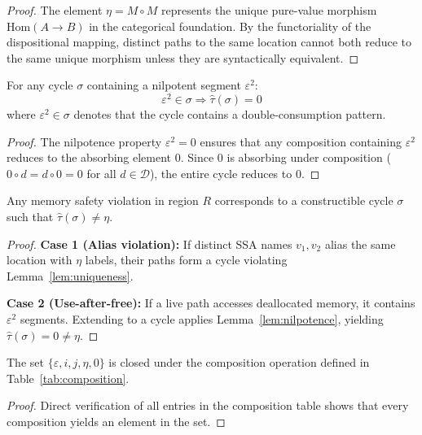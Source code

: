 \documentclass[journal]{IEEEtran}
\begin{document}
\begin{proof}
The element $\eta = M \circ M$ represents the unique pure-value morphism $\text{Hom}(A \to B)$ in the categorical foundation. By the functoriality of the dispositional mapping, distinct paths to the same location cannot both reduce to the same unique morphism unless they are syntactically equivalent.
\end{proof}

\begin{lemma}
\label{lem:nilpotence}
For any cycle $\sigma$ containing a nilpotent segment $\varepsilon^2$:
$$\varepsilon^2 \in \sigma \Rightarrow \hat{\tau}(\sigma) = 0$$
where $\varepsilon^2 \in \sigma$ denotes that the cycle contains a double-consumption pattern.
\end{lemma}

\begin{proof}
The nilpotence property $\varepsilon^2 = 0$ ensures that any composition containing $\varepsilon^2$ reduces to the absorbing element $0$. Since $0$ is absorbing under composition ($0 \circ d = d \circ 0 = 0$ for all $d \in \mathcal{D}$), the entire cycle reduces to $0$.
\end{proof}

\begin{lemma}
\label{lem:cycle_construction}
Any memory safety violation in region $R$ corresponds to a constructible cycle $\sigma$ such that $\hat{\tau}(\sigma) \neq \eta$.
\end{lemma}

\begin{proof}
\textbf{Case 1 (Alias violation):} If distinct SSA names $v_1, v_2$ alias the same location with $\eta$ labels, their paths form a cycle violating Lemma~\ref{lem:uniqueness}.

\textbf{Case 2 (Use-after-free):} If a live path accesses deallocated memory, it contains $\varepsilon^2$ segments. Extending to a cycle applies Lemma~\ref{lem:nilpotence}, yielding $\hat{\tau}(\sigma) = 0 \neq \eta$.
\end{proof}

\begin{theorem}[Closure]
The set $\{\varepsilon, i, j, \eta, 0\}$ is closed under the composition operation defined in Table~\ref{tab:composition}.
\end{theorem}

\begin{proof}
Direct verification of all entries in the composition table shows that every composition yields an element in the set.
\end{proof}
\end{document}
